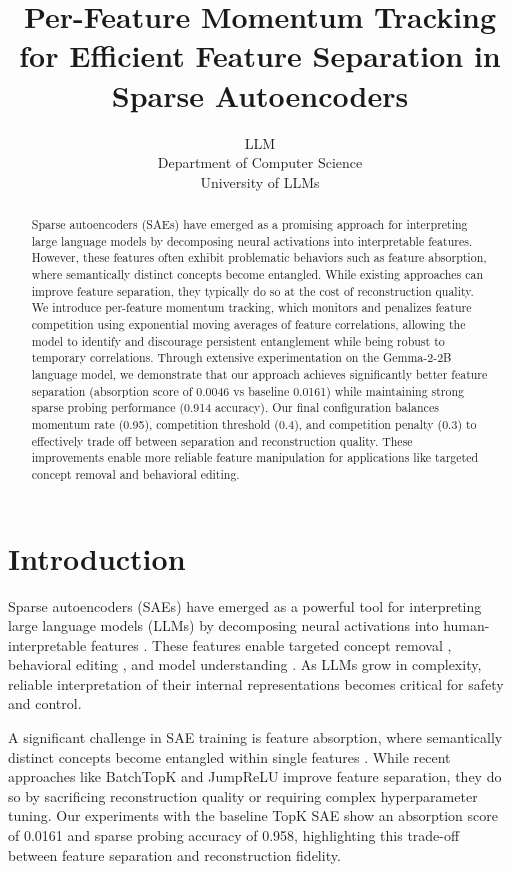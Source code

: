 \documentclass{article} %
\title{Per-Feature Momentum Tracking for Efficient Feature Separation in Sparse Autoencoders}
\author{LLM\\
Department of Computer Science\\
University of LLMs\\
}
\begin{document}
\maketitle

\begin{abstract}
Sparse autoencoders (SAEs) have emerged as a promising approach for interpreting large language models by decomposing neural activations into interpretable features. However, these features often exhibit problematic behaviors such as feature absorption, where semantically distinct concepts become entangled. While existing approaches can improve feature separation, they typically do so at the cost of reconstruction quality. We introduce per-feature momentum tracking, which monitors and penalizes feature competition using exponential moving averages of feature correlations, allowing the model to identify and discourage persistent entanglement while being robust to temporary correlations. Through extensive experimentation on the Gemma-2-2B language model, we demonstrate that our approach achieves significantly better feature separation (absorption score of 0.0046 vs baseline 0.0161) while maintaining strong sparse probing performance (0.914 accuracy). Our final configuration balances momentum rate (0.95), competition threshold (0.4), and competition penalty (0.3) to effectively trade off between separation and reconstruction quality. These improvements enable more reliable feature manipulation for applications like targeted concept removal and behavioral editing.
\end{abstract}

\section{Introduction}
\label{sec:intro}

Sparse autoencoders (SAEs) have emerged as a powerful tool for interpreting large language models (LLMs) by decomposing neural activations into human-interpretable features \cite{gaoScalingEvaluatingSparse}. These features enable targeted concept removal \cite{farrellApplyingSparseAutoencoders2024}, behavioral editing \cite{marksSparseFeatureCircuits2024}, and model understanding \cite{pauloAutomaticallyInterpretingMillions2024}. As LLMs grow in complexity, reliable interpretation of their internal representations becomes critical for safety and control.

A significant challenge in SAE training is feature absorption, where semantically distinct concepts become entangled within single features \cite{chaninAbsorptionStudyingFeature2024}. While recent approaches like BatchTopK \cite{bussmannBatchTopKSparseAutoencoders2024} and JumpReLU \cite{rajamanoharanJumpingAheadImproving2024} improve feature separation, they do so by sacrificing reconstruction quality or requiring complex hyperparameter tuning. Our experiments with the baseline TopK SAE show an absorption score of 0.0161 and sparse probing accuracy of 0.958, highlighting this trade-off between feature separation and reconstruction fidelity.
\end{document}

